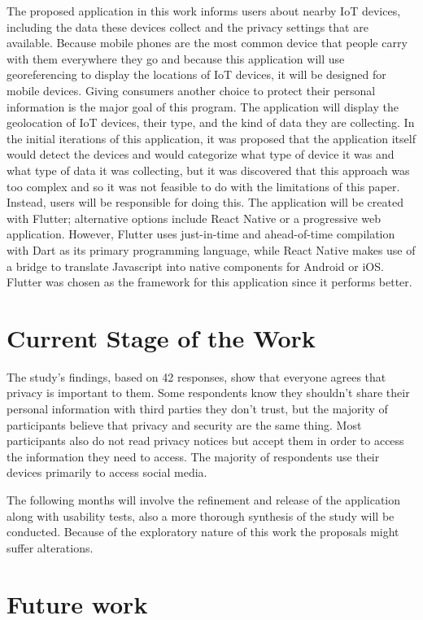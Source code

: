\documentclass[manuscript,screen,review,natbib=false]{acmart}
\begin{document}
The proposed application in this work informs users about nearby IoT devices,
including the data these devices collect and the privacy settings that are
available. Because mobile phones are the most common device that people
carry with them everywhere they go and because this application will use
georeferencing to display the locations of IoT devices, it will be designed
for mobile devices. Giving consumers another choice to protect their personal
information is the major goal of this program.
The application will display the geolocation of IoT devices, their type,
and the kind of data they are collecting. In the initial iterations of this
application, it was proposed that the application itself would detect the
devices and would categorize what type of device it was and what type of
data it was collecting, but it was discovered that this approach was too
complex and so it was not feasible to do with the limitations of this paper.
Instead, users will be responsible for doing this.
The application will be created with Flutter; alternative options include
React Native or a progressive web application. However, Flutter uses
just-in-time and ahead-of-time compilation with Dart as its primary
programming language, while React Native makes use of a bridge to translate
Javascript into native components for Android or iOS. Flutter was chosen as
the framework for this application since it performs better.

\section{Current Stage of the Work}

The study's findings, based on 42 responses, show that everyone agrees that
privacy is important to them. Some respondents know they shouldn't share their
personal information with third parties they don't trust, but the majority of
participants believe that privacy and security are the same thing. Most
participants also do not read privacy notices but accept them in order to
access the information they need to access. The majority of respondents use
their devices primarily to access social media.

The following months will involve the refinement and release of the application along with
usability tests, also a more thorough synthesis of the study will be conducted.
Because of the exploratory nature of this work the proposals might suffer alterations.

\section{Future work}
\end{document}
